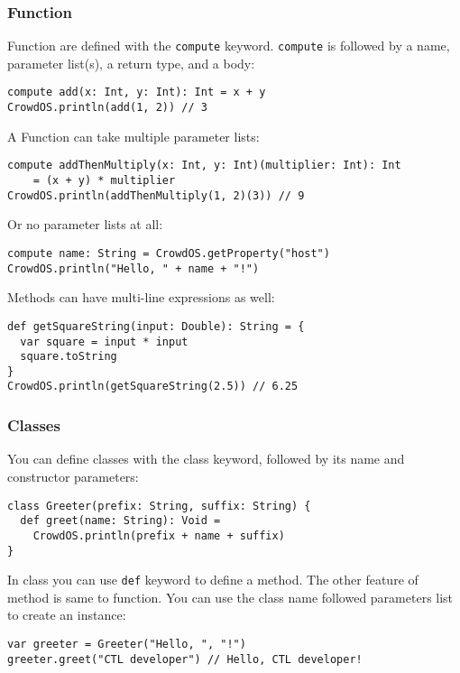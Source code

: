 \subsubsection{Function}
Function are defined with the \texttt{compute} keyword. \texttt{compute} is followed by a name, parameter list(s), a return type, and a body:
\begin{lstlisting}[numbers=none, xleftmargin=0.05\linewidth]
compute add(x: Int, y: Int): Int = x + y
CrowdOS.println(add(1, 2)) // 3
\end{lstlisting}
A Function can take multiple parameter lists:
\begin{lstlisting}[numbers=none, xleftmargin=0.05\linewidth, xrightmargin=0pt]
compute addThenMultiply(x: Int, y: Int)(multiplier: Int): Int 
    = (x + y) * multiplier
CrowdOS.println(addThenMultiply(1, 2)(3)) // 9
\end{lstlisting}
Or no parameter lists at all:
\begin{lstlisting}[numbers=none, xleftmargin=0.05\linewidth]
compute name: String = CrowdOS.getProperty("host")
CrowdOS.println("Hello, " + name + "!")
\end{lstlisting}
Methods can have multi-line expressions as well:
\begin{lstlisting}[numbers=none, xleftmargin=0.05\linewidth]
def getSquareString(input: Double): String = {
  var square = input * input
  square.toString
}
CrowdOS.println(getSquareString(2.5)) // 6.25
\end{lstlisting}

\subsubsection{Classes}
You can define classes with the class keyword, followed by its name and constructor parameters:
\begin{lstlisting}[numbers=none, xleftmargin=0.05\linewidth]
class Greeter(prefix: String, suffix: String) {
  def greet(name: String): Void =
    CrowdOS.println(prefix + name + suffix)
}
\end{lstlisting}
In class you can use \texttt{def} keyword to define a method. The other feature of method is same to function.
You can use the class name followed parameters list to create an instance:
\begin{lstlisting}[numbers=none, xleftmargin=0.05\linewidth]
var greeter = Greeter("Hello, ", "!")
greeter.greet("CTL developer") // Hello, CTL developer!
\end{lstlisting}

